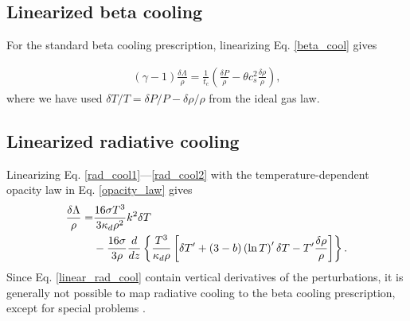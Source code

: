 \subsection{Linearized beta cooling}
For the standard beta cooling prescription, linearizing
Eq. \ref{beta_cool} gives

\begin{align}
  (\gamma-1)\frac{\delta \Lambda}{\rho} = \frac{1}{t_c}\left(\frac{\delta P}{\rho} -
  \theta c_s^2 \frac{\delta\rho}{\rho}\right), \label{linear_beta}
\end{align}
where we have used $\delta T/T  = \delta P/P - \delta\rho/\rho$ from
the ideal gas law. 

\subsection{Linearized radiative cooling}
Linearizing Eq. \ref{rad_cool1}---\ref{rad_cool2} with the
temperature-dependent opacity law in Eq. \ref{opacity_law} gives
\begin{align}
  \frac{\delta \Lambda}{\rho} 
  =& \frac{16\sigma T^3}{3\kappa_d\rho^2} k^2 \delta T \notag\\
  & - \frac{16\sigma }{3\rho}\frac{d}{dz}\left\{
  \frac{T^3}{\kappa_d\rho}\left[\delta T^\prime +
    (3-b)\left(\ln{T}\right)^\prime \delta T - T^\prime \frac{\delta\rho}{\rho}\right]
  \right\}.\label{linear_rad_cool}
\end{align}
Since Eq. \ref{linear_rad_cool} contain vertical derivatives of the
perturbations, it is generally not possible to map radiative cooling 
to the beta cooling prescription, except for special problems
\citep[e.g.][]{lin15}. 

